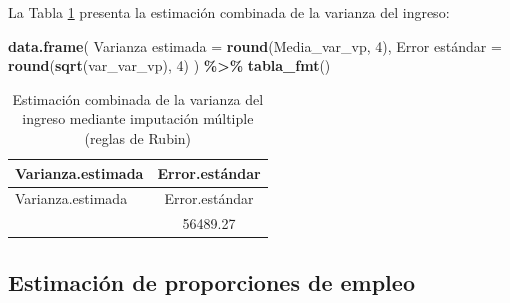 \documentclass[
  spanish,
  12pt,
]{book}
\newenvironment{Shaded}{\begin{snugshade}}{\end{snugshade}}
\newcommand{\AttributeTok}[1]{\textcolor[rgb]{0.13,0.29,0.53}{#1}}
\newcommand{\DecValTok}[1]{\textcolor[rgb]{0.00,0.00,0.81}{#1}}
\newcommand{\FunctionTok}[1]{\textcolor[rgb]{0.13,0.29,0.53}{\textbf{#1}}}
\newcommand{\NormalTok}[1]{#1}
\newcommand{\OtherTok}[1]{\textcolor[rgb]{0.56,0.35,0.01}{#1}}
\newcommand{\SpecialCharTok}[1]{\textcolor[rgb]{0.81,0.36,0.00}{\textbf{#1}}}
\newcommand{\StringTok}[1]{\textcolor[rgb]{0.31,0.60,0.02}{#1}}
\begin{document}
La Tabla \ref{tab:tab-im-resultado-varianza} presenta la estimación combinada de la varianza del ingreso:

\begin{Shaded}
\end{Shaded}

\begin{Shaded}
\begin{Highlighting}[]
\FunctionTok{data.frame}\NormalTok{(}
  \StringTok{\textasciigrave{}}\AttributeTok{Varianza estimada}\StringTok{\textasciigrave{}}  \OtherTok{=} \FunctionTok{round}\NormalTok{(Media\_var\_vp, }\DecValTok{4}\NormalTok{),}
  \StringTok{\textasciigrave{}}\AttributeTok{Error estándar}\StringTok{\textasciigrave{}}     \OtherTok{=} \FunctionTok{round}\NormalTok{(}\FunctionTok{sqrt}\NormalTok{(var\_var\_vp), }\DecValTok{4}\NormalTok{)}
\NormalTok{) }\SpecialCharTok{\%\textgreater{}\%} \FunctionTok{tabla\_fmt}\NormalTok{()}
\end{Highlighting}
\end{Shaded}

\begin{longtable}[]{@{}lc@{}}
\caption{\label{tab:tab-im-resultado-varianza}Estimación combinada de la varianza del ingreso mediante imputación múltiple (reglas de Rubin)}\tabularnewline
\toprule\noalign{}
Varianza.estimada & Error.estándar \\
\midrule\noalign{}
\endfirsthead
\toprule\noalign{}
Varianza.estimada & Error.estándar \\
\midrule\noalign{}
\endhead
\bottomrule\noalign{}
\endlastfoot
269223 & 56489.27 \\
\end{longtable}

\subsection{Estimación de proporciones de empleo}\label{estimaciuxf3n-de-proporciones-de-empleo}
\end{document}
